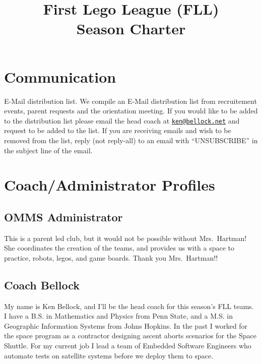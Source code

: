 \documentclass[letter]{article}
\author{}
\title{First Lego League (FLL) \\ \season{} Season Charter}
\date{}
\begin{document}
\maketitle
\thispagestyle{firststyle}

\hypertarget{communication}{%
\section{Communication}\label{communication}}

E-Mail distribution list. We compile an E-Mail distribution list from
recruitement events, parent requests and the orientation meeting. If you
would like to be added to the distribution list please email the head
coach at \href{mailto:ken@bellock.net}{\nolinkurl{ken@bellock.net}} and
request to be added to the list. If you are receiving emails and wish to
be removed from the list, reply (not reply-all) to an email with
``UNSUBSCRIBE'' in the subject line of the email.

\hypertarget{coach-profiles}{%
\section{Coach/Administrator Profiles}\label{coach-profiles}}

\hypertarget{omms-sponsor}{%
\subsection{OMMS Administrator}\label{omms-sponsor}}

This is a parent led club, but it would not be possible without
Mrs.~Hartman! She coordinates the creation of the teams, and provides us
with a space to practice, robots, legos, and game boards. Thank you
Mrs.~Hartman!!

\hypertarget{head-coach}{%
\subsection{Coach Bellock}\label{head-coach}}

My name is Ken Bellock, and I'll be the head coach for this season's FLL
teams. I have a B.S. in Mathematics and Physics from Penn State, and a
M.S. in Geographic Information Systems from Johns Hopkins. In the past I
worked for the space program as a contractor designing ascent aborts
scenarios for the Space Shuttle. For my current job I lead a team of
Embedded Software Engineers who automate tests on satellite systems
before we deploy them to space.
\end{document}
